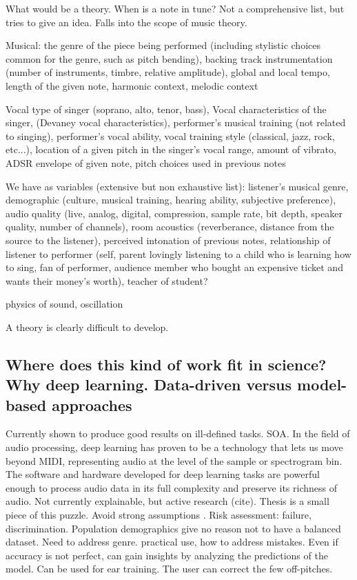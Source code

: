 What would be a theory. When is a note in tune? Not a comprehensive list, but tries to give an idea. Falls into the scope of music theory. 

Musical: the genre of the piece being performed (including stylistic choices common for the genre, such as pitch bending), backing track instrumentation (number of instruments, timbre, relative amplitude), global and local tempo, length of the given note, harmonic context, melodic context 

Vocal type of singer (soprano, alto, tenor, bass), Vocal characteristics of the singer, (Devaney vocal characteristics), performer's musical training (not related to singing), performer's vocal ability, vocal training style (classical, jazz, rock, etc...), location of a given pitch in the singer's vocal range, amount of vibrato, ADSR envelope of given note, pitch choices used in previous notes

We have as variables (extensive but non exhaustive list): listener's musical genre, demographic (culture, musical training, hearing ability, subjective preference), audio quality (live, analog, digital, compression, sample rate, bit depth, speaker quality, number of channels), room acoustics (reverberance, distance from the source to the listener), perceived intonation of previous notes, relationship of listener to performer (self, parent lovingly listening to a child who is learning how to sing, fan of performer, audience member who bought an expensive ticket and wants their money's worth), teacher of student?

physics of sound, oscillation

A theory is clearly difficult to develop.


\subsection{Where does this kind of work fit in science? Why deep learning. Data-driven versus model-based approaches}
Currently shown to produce good results on ill-defined tasks. SOA. 
In the field of audio processing, deep learning has proven to be a technology that lets us move beyond MIDI, representing audio at the level of the sample or spectrogram bin. The software and hardware developed for deep learning tasks are powerful enough to process audio data in its full complexity and preserve its richness of audio.
Not currently explainable, but active research (cite).
Thesis is a small piece of this puzzle.
Avoid strong assumptions \cite{wager2019causal}.
Risk assessment: failure, discrimination.
Population demographics give no reason not to have a balanced dataset. Need to address genre.
practical use, how to address mistakes.
Even if accuracy is not perfect, can gain insights by analyzing the predictions of the model. Can be used for ear training. The user can correct the few off-pitches.